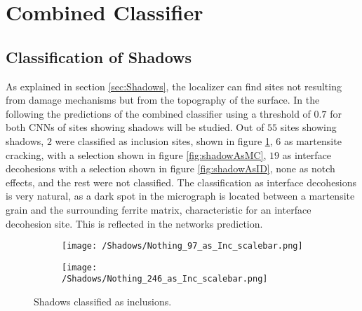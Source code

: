 \section{Combined Classifier}
%

\subsection{Classification of Shadows}
\label{sec:Robustness}
As explained in section \ref{sec:Shadows}, the localizer can find sites not resulting from damage mechanisms but from the topography of the surface. In the following the predictions of the combined classifier using a threshold of $0.7$ for both CNNs of sites showing shadows will be studied. Out of $55$ sites showing shadows, $2$ were classified as inclusion sites, shown in figure \ref{fig:shadowAsInc}, $6$ as martensite cracking, with a selection shown in figure \ref{fig:shadowAsMC}, $19$ as interface decohesions with a selection shown in figure \ref{fig:shadowAsID}, none as notch effects, and the rest were not classified. The classification as interface decohesions is very natural, as a dark spot in the micrograph is located between a martensite grain and the surrounding ferrite matrix, characteristic for an interface decohesion site. This is reflected in the networks prediction.

\begin{figure}[H]
\centering
\begin{subfigure}{0.24\textwidth}
\texttt{[image: /Shadows/Nothing\_97\_as\_Inc\_scalebar.png]}
\caption{}
\end{subfigure}
\centering
\begin{subfigure}{0.24\textwidth}
\texttt{[image: /Shadows/Nothing\_246\_as\_Inc\_scalebar.png]}
\caption{}
\end{subfigure}
\caption{Shadows classified as inclusions.}
\label{fig:shadowAsInc}
\end{figure}

